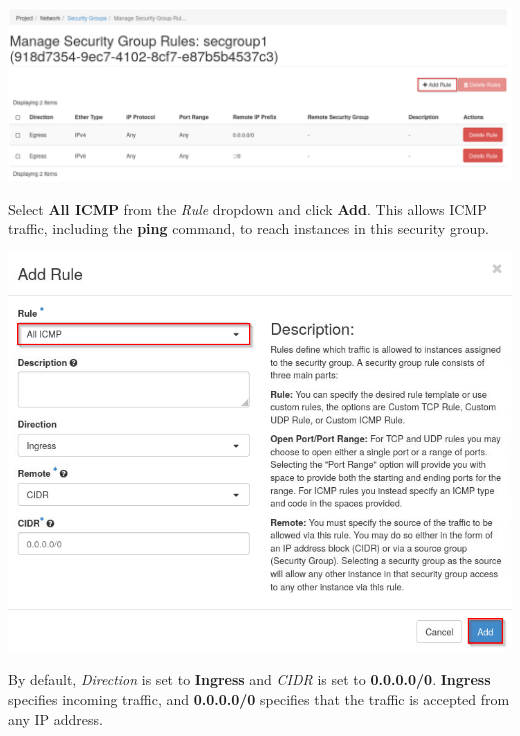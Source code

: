 \documentclass[letterpaper, 12pt]{article}
\begin{document}
\begin{enumerate}
\begin{labstep}
        \begin{center}
            \includegraphics[width=\linewidth]{images/part1/step6.png}
        \end{center}
    \end{labstep}

    \begin{labstep}
        Select \textbf{All ICMP} from the \textit{Rule} dropdown and click \textbf{Add}.
        This allows ICMP traffic, including the \textbf{ping} command, to reach instances in this security group.

        \begin{center}
            \includegraphics[width=\linewidth]{images/part1/step7.png}
        \end{center}
    \end{labstep}

    \begin{notebox}
        By default, \textit{Direction} is set to \textbf{Ingress} and \textit{CIDR} is set to \textbf{0.0.0.0/0}.
        \textbf{Ingress} specifies incoming traffic, and \textbf{0.0.0.0/0} specifies that the traffic is accepted from any IP address.
    \end{notebox}


\end{enumerate}
\end{document}
